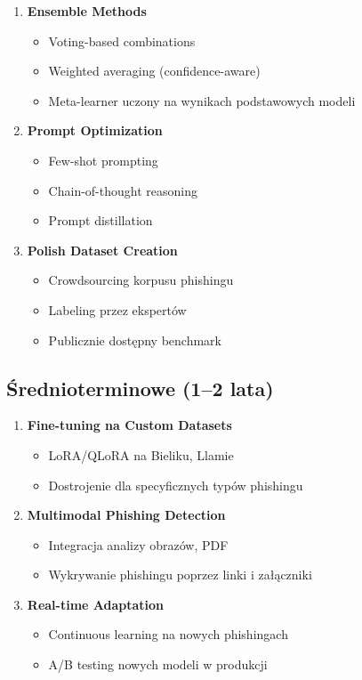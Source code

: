 \documentclass[11pt]{extreport}
\begin{document}
\begin{enumerate}
    \item \textbf{Ensemble Methods}
    \begin{itemize}
        \item Voting-based combinations
        \item Weighted averaging (confidence-aware)
        \item Meta-learner uczony na wynikach podstawowych modeli
    \end{itemize}
    
    \item \textbf{Prompt Optimization}
    \begin{itemize}
        \item Few-shot prompting
        \item Chain-of-thought reasoning
        \item Prompt distillation
    \end{itemize}
    
    \item \textbf{Polish Dataset Creation}
    \begin{itemize}
        \item Crowdsourcing korpusu phishingu
        \item Labeling przez ekspertów
        \item Publicznie dostępny benchmark
    \end{itemize}
\end{enumerate}

\subsection{Średnioterminowe (1--2 lata)}

\begin{enumerate}
    \item \textbf{Fine-tuning na Custom Datasets}
    \begin{itemize}
        \item LoRA/QLoRA na Bieliku, Llamie
        \item Dostrojenie dla specyficznych typów phishingu
    \end{itemize}
    
    \item \textbf{Multimodal Phishing Detection}
    \begin{itemize}
        \item Integracja analizy obrazów, PDF
        \item Wykrywanie phishingu poprzez linki i załączniki
    \end{itemize}
    
    \item \textbf{Real-time Adaptation}
    \begin{itemize}
        \item Continuous learning na nowych phishingach
        \item A/B testing nowych modeli w produkcji
    \end{itemize}
\end{enumerate}
\end{document}
